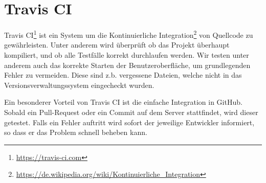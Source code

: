 

\section{Travis CI}

Travis CI\footnote{\url{https://travis-ci.com}} ist ein System um die Kontinuierliche Integration\footnote{\url{https://de.wikipedia.org/wiki/Kontinuierliche_Integration}} von Quellcode zu gew\"ahrleisten. Unter anderem wird \"uberpr\"uft ob das Projekt \"uberhaupt kompiliert, und ob alle Testf\"alle korrekt durchlaufen werden. Wir testen unter anderem auch das korrekte Starten der Benutzeroberfl\"ache, um grundlegenden Fehler zu vermeiden. Diese sind z.b. vergessene Dateien, welche nicht in das Versionsverwaltungssystem eingecheckt wurden.

Ein besonderer Vorteil von Travis CI ist die einfache Integration in GitHub. Sobald ein Pull-Request oder ein Commit auf dem Server stattfindet, wird dieser getestet. Falls ein Fehler auftritt wird sofort der jeweilige Entwickler informiert, so dass er das Problem schnell beheben kann.